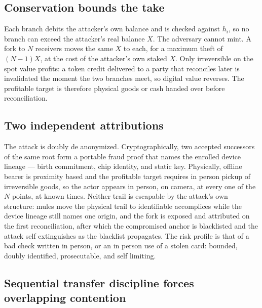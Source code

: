 \documentclass[11pt]{article}
\theoremstyle{definition}
\theoremstyle{remark}
\begin{document}
\subsection{Conservation bounds the take}

Each branch debits the attacker's own balance and is checked against \(h_i\), so no branch can exceed
the attacker's real balance \(X\). The adversary cannot mint. A fork to \(N\) receivers moves the same
\(X\) to each, for a maximum theft of \((N-1)X\), at the cost of the attacker's own staked \(X\). Only
irreversible on the spot value profits: a token credit delivered to a party that reconciles later is
invalidated the moment the two branches meet, so digital value reverses. The profitable target is
therefore physical goods or cash handed over before reconciliation.

\subsection{Two independent attributions}

The attack is doubly de anonymized. Cryptographically, two accepted successors of the same root form
a portable fraud proof that names the enrolled device lineage --- birth commitment, chip identity, and
static key. Physically, offline bearer is proximity based and the profitable target requires in person
pickup of irreversible goods, so the actor appears in person, on camera, at every one of the \(N\)
points, at known times. Neither trail is escapable by the attack's own structure: mules move the
physical trail to identifiable accomplices while the device lineage still names one origin, and the
fork is exposed and attributed on the first reconciliation, after which the compromised anchor is
blacklisted and the attack self extinguishes as the blacklist propagates. The risk profile is that of
a bad check written in person, or an in person use of a stolen card: bounded, doubly identified,
prosecutable, and self limiting.

\subsection{Sequential transfer discipline forces overlapping contention}
\end{document}

